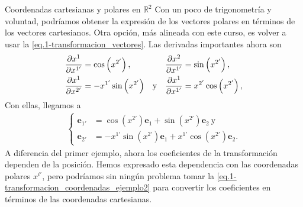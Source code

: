 \begin{example}{Coordenadas cartesianas y polares en \(\mathbb{R}^2\)}
    Con un poco de trigonometría y voluntad, podríamos obtener la expresión de los vectores polares en términos de los vectores cartesianos. Otra opción, más alineada con este curso, es volver a usar la \cref{eq.1-transformacion_vectores}. Las derivadas importantes ahora son
    \begin{align*}
        \frac{\partial x^{1}}{\partial x^{1'}} &= \cos\left(x^{2'}\right), & &&  \frac{\partial x^{2}}{\partial x^{1'}} &= \sin\left(x^{2'}\right),\\
        \frac{\partial x^{1}}{\partial x^{2'}} &= -x^{1'}\sin\left(x^{2'}\right) & \text{y} &&
        \frac{\partial x^{1}}{\partial x^{1'}} &= x^{2'}\cos\left(x^{2'}\right),
    \end{align*}
    Con ellas, llegamos a 
    \begin{align}
        \left\{\begin{aligned}
            \mathbf{e}_{1'} &= \cos\left(x^{2'}\right) \mathbf{e}_{1} + \sin\left(x^{2'}\right) \mathbf{e}_{2}
            \ \text{y}\\
            \mathbf{e}_{2'} &= -x^{1'}\sin\left(x^{2'}\right) \mathbf{e}_{1} + x^{1'}\cos\left(x^{2'}\right) \mathbf{e}_{2}.
        \end{aligned}\right.
    \end{align}
    A diferencia del primer ejemplo, ahora los coeficientes de la transformación dependen de la posición. Hemos expresado esta dependencia con las coordenadas polares \(x^{i'}\), pero podríamos sin ningún problema tomar la \cref{eq.1-transformacion_coordenadas_ejemplo2} para convertir los coeficientes en términos de las coordenadas cartesianas.
\end{example}

